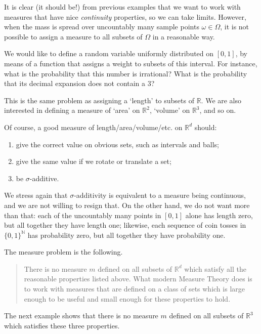 \documentclass[
]{book}
\newcommand{\N}{\mathbb{N}}
\newcommand{\R}{\mathbb{R}}
\theoremstyle{definition}
\theoremstyle{definition}
\theoremstyle{definition}
\theoremstyle{definition}
\theoremstyle{remark}
\begin{document}
It is clear (it should be!) from previous examples that we want to work
with measures that have nice \emph{continuity} properties, so we can take
limits. However, when the mass is spread over uncountably many sample
points \(\omega \in \Omega\), it is not possible to assign a measure to
all subsets of \(\Omega\) in a reasonable way.

We would like to define a random variable uniformly distributed on
\([0,1]\), by means of a function that assigns a weight to subsets of this
interval. For instance, what is the probability that this number is
irrational? What is the probability that its decimal expansion does not
contain a 3?

This is the same problem as assigning a `length' to subsets of \(\R\). We
are also interested in defining a measure of `area' on \(\R^2\), `volume'
on \(\R^3\), and so on.

Of course, a good measure of length/area/volume/etc. on \(\R^d\) should:

\begin{enumerate}
\def\labelenumi{\arabic{enumi}.}
\item
  give the correct value on obvious sets, such as intervals and balls;
\item
  give the same value if we rotate or translate a set;
\item
  be \(\sigma\)-additive.
\end{enumerate}

We stress again that \(\sigma\)-additivity is equivalent to a measure being
continuous, and we are not willing to resign that. On the other hand, we
do not want more than that: each of the uncountably many points in
\([0,1]\) alone has length zero, but all together they have length one;
likewise, each sequence of coin tosses in \(\{0,1\}^{\N}\) has probability
zero, but all together they have probability one.

The measure problem is the following.

\begin{quote}
There is no measure \(m\) defined on all subsets of \(\R^d\) which satisfy
all the reasonable properties listed above. What modern Measure Theory
does is to work with measures that are defined on a class of sets which
is large enough to be useful and small enough for these properties to
hold.
\end{quote}

The next example shows that there is no measure \(m\) defined on all
subsets of \(\R^3\) which satisfies these three properties.
\end{document}
